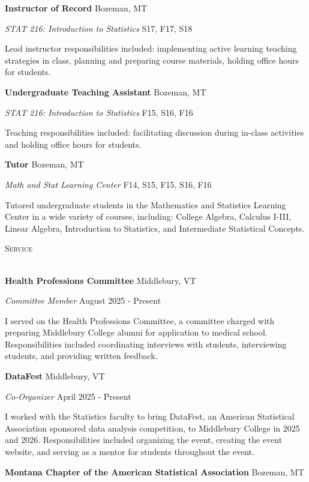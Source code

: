 \documentclass[a4paper]{article}
\newcommand{\lineunder} {
	\vspace*{-8pt} \\
	\hspace*{-18pt} \hrulefill \\
}
\newcommand{\header} [1] {
	{\hspace*{-18pt}\vspace*{6pt} \textcolor{Cerulean}{\textsc{#1}}}
	\vspace*{-6pt} \textcolor{Cerulean}{\lineunder}
}
\begin{document}
\textbf{Instructor of Record} \hfill Bozeman, MT

\emph{STAT 216: Introduction to Statistics} \hfill S17, F17, S18

Lead instructor responsibilities included: implementing active learning
teaching strategies in class, planning and preparing course materials,
holding office hours for students. \vspace*{2mm}

\textbf{Undergraduate Teaching Assistant} \hfill Bozeman, MT

\emph{STAT 216: Introduction to Statistics} \hfill F15, S16, F16

Teaching responsibilities included: facilitating discussion during
in-class activities and holding office hours for students. \vspace*{2mm}

\textbf{Tutor} \hfill Bozeman, MT

\emph{Math and Stat Learning Center} \hfill F14, S15, F15, S16, F16

Tutored undergraduate students in the Mathematics and Statistics
Learning Center in a wide variety of courses, including: College
Algebra, Calculus I-III, Linear Algebra, Introduction to Statistics, and
Intermediate Statistical Concepts.\vspace*{2mm}

\header{Service}

\textbf{Health Professions Committee} \hfill Middlebury, VT

\emph{Committee Member} \hfill August 2025 - Present

I served on the Health Professions Committee, a committee charged with
preparing Middlebury College alumni for application to medical school.
Responsibilities included coordinating interviews with students,
interviewing students, and providing written feedback. \vspace*{2mm}

\textbf{DataFest} \hfill Middlebury, VT

\emph{Co-Organizer} \hfill April 2025 - Present

I worked with the Statistics faculty to bring DataFest, an American
Statistical Association sponsored data analysis competition, to
Middlebury College in 2025 and 2026. Responsibilities included
organizing the event, creating the event website, and serving as a
mentor for students throughout the event. \vspace*{2mm}

\textbf{Montana Chapter of the American Statistical Association}
\hfill Bozeman, MT
\end{document}
